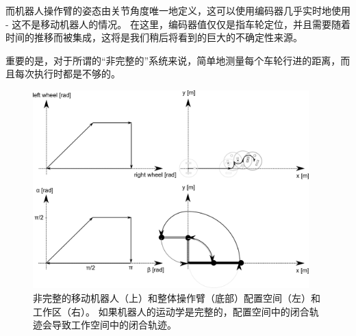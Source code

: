 而机器人操作臂的姿态由关节角度唯一地定义，这可以使用编码器几乎实时地使用 - 这不是移动机器人的情况。 在这里，编码器值仅仅是指车轮定位，并且需要随着时间的推移而被集成，这将是我们稍后将看到的巨大的不确定性来源。


重要的是，对于所谓的“非完整的”系统来说，简单地测量每个车轮行进的距离，而且每次执行时都是不够的。

\begin{figure}[htb!]
	\centering
		\includegraphics[width=0.95\textwidth]{figs/holonomy.png}
	\caption{非完整的移动机器人（上）和整体操作臂（底部）配置空间（左）和工作区（右）。 如果机器人的运动学是完整的，配置空间中的闭合轨迹会导致工作空间中的闭合轨迹。}
	\label{fig:holonomy}
\end{figure}

